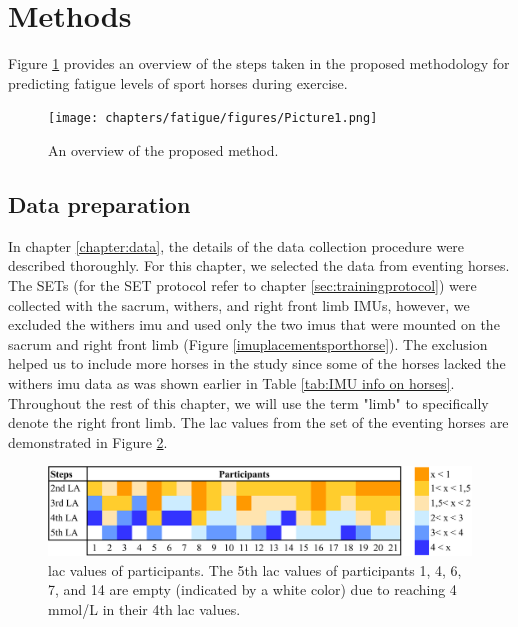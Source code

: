 \section{Methods}
\label{sec:methods}

Figure \ref{system} provides an overview of the steps taken in the proposed methodology for predicting fatigue levels of sport horses during exercise.

\begin{figure}[htb]
\centering
\texttt{[image: chapters/fatigue/figures/Picture1.png]}
\caption{An overview of the proposed method.}
\label{system}
\end{figure}

\subsection{Data preparation}
In chapter \ref{chapter:data}, the details of the data collection procedure were described thoroughly. For this chapter, we selected the data from eventing horses. The SETs (for the SET protocol refer to chapter \ref{sec:trainingprotocol}) were collected with the sacrum, withers, and right front limb IMUs, however, we excluded the withers \gls{imu} and used only the two \gls{imu}s that were mounted on the sacrum and right front limb (Figure \ref{imuplacementsporthorse}). The exclusion helped us to include more horses in the study since some of the horses lacked the withers \gls{imu} data as was shown earlier in Table \ref{tab:IMU info on horses}. Throughout the rest of this chapter, we will use the term "limb" to specifically denote the right front limb. The \gls{lac} values from the \gls{set} of the eventing horses are demonstrated in Figure \ref{lactate_heat_map}.

\begin{figure}[htb]
\centering
\includegraphics[width=.95\linewidth]{chapters/fatigue/figures/Picture2.png}
\caption{\gls{lac} values of participants. The 5th \gls{lac} values of participants 1, 4, 6, 7, and 14 are empty (indicated by a white color) due to reaching 4 \gls{mmol/L} in their 4th \gls{lac} values.}
\label{lactate_heat_map}
\end{figure}


